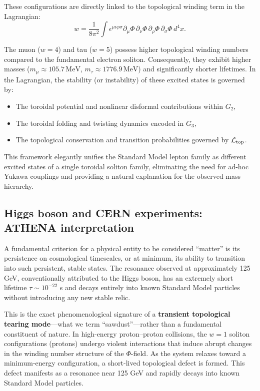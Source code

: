 \documentclass[11pt,a4paper]{article}
\begin{document}
These configurations are directly linked to the topological winding term in the Lagrangian:
\[
w = \frac{1}{8\pi^2} \int \epsilon^{\mu\nu\rho\sigma} \partial_\mu \Phi \, \partial_\nu \Phi \, \partial_\rho \Phi \, \partial_\sigma \Phi \, d^4x.
\]

The muon (\(w=4\)) and tau (\(w=5\)) possess higher topological winding numbers compared to the fundamental electron soliton. Consequently, they exhibit higher masses (\(m_\mu \approx 105.7\,\mathrm{MeV}\), \(m_\tau \approx 1776.9\,\mathrm{MeV}\)) and significantly shorter lifetimes. In the Lagrangian, the stability (or instability) of these excited states is governed by:
\begin{itemize}
    \item The toroidal potential and nonlinear disformal contributions within \(G_2\),
    \item The toroidal folding and twisting dynamics encoded in \(G_3\),
    \item The topological conservation and transition probabilities governed by \(\mathcal{L}_{\rm top}\).
\end{itemize}

This framework elegantly unifies the Standard Model lepton family as different excited states of a single toroidal soliton family, eliminating the need for ad-hoc Yukawa couplings and providing a natural explanation for the observed mass hierarchy.

\subsection{Higgs boson and CERN experiments: ATHENA interpretation}
\label{subsec:higgs}

A fundamental criterion for a physical entity to be considered ``matter'' is its persistence on cosmological timescales, or at minimum, its ability to transition into such persistent, stable states. The resonance observed at approximately 125 GeV, conventionally attributed to the Higgs boson, has an extremely short lifetime \(\tau \sim 10^{-22}\) s and decays entirely into known Standard Model particles without introducing any new stable relic.

This is the exact phenomenological signature of a \textbf{transient topological tearing mode}---what we term ``sawdust''---rather than a fundamental constituent of nature. In high-energy proton--proton collisions, the \(w=1\) soliton configurations (protons) undergo violent interactions that induce abrupt changes in the winding number structure of the \(\Phi\)-field. As the system relaxes toward a minimum-energy configuration, a short-lived topological defect is formed. This defect manifests as a resonance near 125 GeV and rapidly decays into known Standard Model particles.
\end{document}
